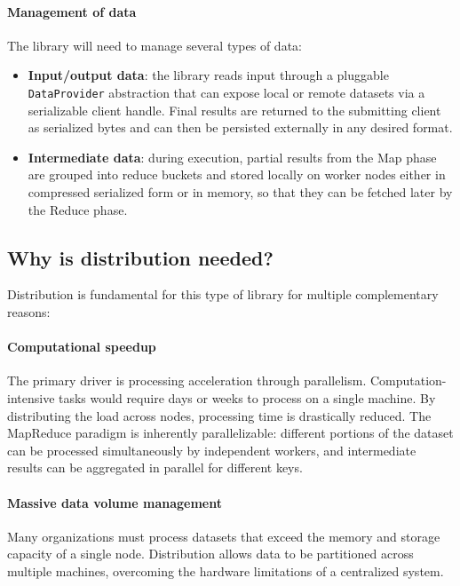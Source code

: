 \documentclass{scrartcl}
\begin{document}
\paragraph{Management of data}
The library will need to manage several types of data:

\begin{itemize}
    \item \textbf{Input/output data}: the library reads input through a pluggable \texttt{DataProvider} abstraction that can expose local or remote datasets via a serializable client handle. Final results are returned to the submitting client as serialized bytes and can then be persisted externally in any desired format.
    \item \textbf{Intermediate data}: during execution, partial results from the Map phase are grouped into reduce buckets and stored locally on worker nodes either in compressed serialized form or in memory, so that they can be fetched later by the Reduce phase.
\end{itemize}

\subsection{Why is distribution needed?}

Distribution is fundamental for this type of library for multiple complementary reasons:

\paragraph{Computational speedup}
The primary driver is processing acceleration through parallelism. Computation-intensive tasks would require days or weeks to process on a single machine. By distributing the load across nodes, processing time is drastically reduced. The MapReduce paradigm is inherently parallelizable: different portions of the dataset can be processed simultaneously by independent workers, and intermediate results can be aggregated in parallel for different keys.

\paragraph{Massive data volume management}
Many organizations must process datasets that exceed the memory and storage capacity of a single node. Distribution allows data to be partitioned across multiple machines, overcoming the hardware limitations of a centralized system.
\end{document}
